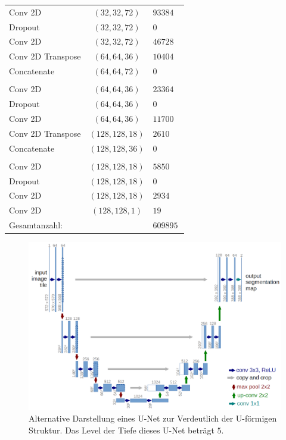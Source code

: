 \begin{table}
{\begin{tabular}{l c l}
        Conv 2D               & $(32, 32, 72)  $ & $93384 $ \\       
        Dropout             & $(32, 32, 72)  $ & $0  $ \\       
        Conv 2D               & $(32, 32, 72)  $ & $46728 $ \\       
        Conv 2D Transpose & $(64, 64, 36)  $ & $10404 $ \\       
        Concatenate     & $(64, 64, 72)  $ & $0  $ \\                             
        & & \\             
        Conv 2D             & $(64, 64, 36)  $ & $23364 $ \\       
        Dropout             & $(64, 64, 36)  $ & $0  $ \\       
        Conv 2D              & $(64, 64, 36)  $ & $11700 $ \\       
        Conv 2D Transpose & $(128, 128, 18)$ & $2610  $ \\       
        Concatenate     & $(128, 128, 36)$ & $0  $ \\
        & & \\             
        Conv 2D             & $(128, 128, 18)$ & $5850  $ \\       
        Dropout             & $(128, 128, 18)$ & $0  $ \\       
        Conv 2D              & $(128, 128, 18)$ & $2934  $ \\       
        Conv 2D              & $(128, 128, 1) $ & $19 $ \\
        \hline
        Gesamtanzahl: & & $\SI{609895}{}$ \\
        \bottomrule
    \end{tabular}
    }
\end{table}

\begin{figure}
    \centering
    \caption{Alternative Darstellung eines U-Net zur Verdeutlich der U-förmigen Struktur. Das Level der Tiefe dieses U-Net beträgt $5$. \cite{RFB15a}}
    \includegraphics[width=\textwidth]{content/img/u-net-architecture.png}
\end{figure}

